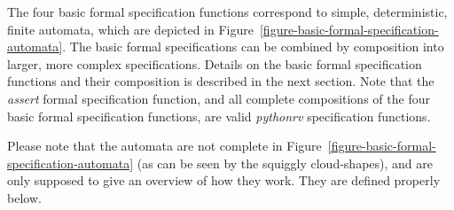 The four basic formal specification functions correspond to simple,
deterministic, finite automata, which are depicted in
Figure~\ref{figure-basic-formal-specification-automata}. The basic formal
specifications can be combined by composition into larger, more complex
specifications. Details on the basic formal specification functions and their
composition is described in the next section. Note that the \textit{assert}
formal specification function, and all complete compositions of the four basic
formal specification functions, are valid \textit{pythonrv} specification
functions.

Please note that the automata are not complete in
Figure~\ref{figure-basic-formal-specification-automata} (as can be seen by the
squiggly cloud-shapes), and are only supposed to give an overview of how they
work. They are defined properly below.

